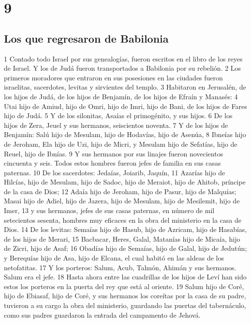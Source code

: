 \chapter{9}

\section*{Los que regresaron de Babilonia}


1 Contado todo Israel por sus genealogías, fueron escritos en el libro de los reyes de Israel. Y los de Judá fueron transportados a Babilonia por su rebelión.
2 Los primeros moradores que entraron en sus posesiones en las ciudades fueron israelitas, sacerdotes, levitas y sirvientes del templo.
3 Habitaron en Jerusalén, de los hijos de Judá, de los hijos de Benjamín, de los hijos de Efraín y Manasés:
4 Utai hijo de Amiud, hijo de Omri, hijo de Imri, hijo de Bani, de los hijos de Fares hijo de Judá.
5 Y de los silonitas, Asaías el primogénito, y sus hijos.
6 De los hijos de Zera, Jeuel y sus hermanos, seiscientos noventa.
7 Y de los hijos de Benjamín: Salú hijo de Mesulam, hijo de Hodavías, hijo de Asenúa,
8 Ibneías hijo de Jeroham, Ela hijo de Uzi, hijo de Micri, y Mesulam hijo de Sefatías, hijo de Reuel, hijo de Ibnías.
9 Y sus hermanos por sus linajes fueron novecientos cincuenta y seis. Todos estos hombres fueron jefes de familia en sus casas paternas.
10 De los sacerdotes: Jedaías, Joiarib, Jaquín,
11 Azarías hijo de Hilcías, hijo de Mesulam, hijo de Sadoc, hijo de Meraiot, hijo de Ahitob, príncipe de la casa de Dios;
12 Adaía hijo de Jeroham, hijo de Pasur, hijo de Malquías; Masai hijo de Adiel, hijo de Jazera, hijo de Mesulam, hijo de Mesilemit, hijo de Imer,
13 y sus hermanos, jefes de sus casas paternas, en número de mil setecientos sesenta, hombres muy eficaces en la obra del ministerio en la casa de Dios.
14 De los levitas: Semaías hijo de Hasub, hijo de Azricam, hijo de Hasabías, de los hijos de Merari,
15 Bacbacar, Heres, Galal, Matanías hijo de Micaía, hijo de Zicri, hijo de Asaf;
16 Obadías hijo de Semaías, hijo de Galal, hijo de Jedutún; y Berequías hijo de Asa, hijo de Elcana, el cual habitó en las aldeas de los netofatitas.
17 Y los porteros: Salum, Acub, Talmón, Ahimán y sus hermanos. Salum era el jefe.
18 Hasta ahora entre las cuadrillas de los hijos de Leví han sido estos los porteros en la puerta del rey que está al oriente.
19 Salum hijo de Coré, hijo de Ebiasaf, hijo de Coré, y sus hermanos los coreítas por la casa de su padre, tuvieron a su cargo la obra del ministerio, guardando las puertas del tabernáculo, como sus padres guardaron la entrada del campamento de Jehová.

